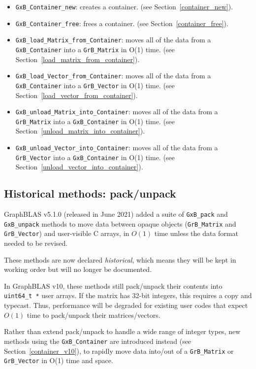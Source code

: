 \begin{itemize}
\item \verb'GxB_Container_new': creates a container.
    (see Section~\ref{container_new}).

\item \verb'GxB_Container_free': frees a container.
    (see Section~\ref{container_free}).

\item \verb'GxB_load_Matrix_from_Container': moves all of the data from a
    \verb'GxB_Container' into a \verb'GrB_Matrix' in O(1) time.
    (see Section~\ref{load_matrix_from_container}).

\item \verb'GxB_load_Vector_from_Container': moves all of the data from a
    \verb'GxB_Container' into a \verb'GrB_Vector' in O(1) time.
    (see Section~\ref{load_vector_from_container}).

\item \verb'GxB_unload_Matrix_into_Container': moves all of the data from
    a \verb'GrB_Matrix' into a \verb'GxB_Container' in O(1) time.
    (see Section~\ref{unload_matrix_into_container}).

\item \verb'GxB_unload_Vector_into_Container': moves all of the data from
    a \verb'GrB_Vector' into a \verb'GxB_Container' in O(1) time.
    (see Section~\ref{unload_vector_into_container}).

\end{itemize}

\subsection{Historical methods: pack/unpack}

GraphBLAS v5.1.0 (released in June 2021) added a suite of \verb'GxB_pack' and
\verb'GxB_unpack' methods to move data between opaque objects
(\verb'GrB_Matrix' and \verb'GrB_Vector') and user-visible C arrays, in $O(1)$
time unless the data format needed to be revised.

These methods are now declared {\em historical}, which means they will be kept
in working order but will no longer be documented.

In GraphBLAS v10, these methods still pack/unpack their contents into
\verb'uint64_t *' user arrays.  If the matrix has 32-bit integers, this
requires a copy and typecast.  Thus, performance will be degraded for existing
user codes that expect $O(1)$ time to pack/unpack their matrices/vectors.

Rather than extend pack/unpack to handle a wide range of integer types, new
methods using the \verb'GxB_Container' are introduced instead (see
Section~\ref{container_v10}), to rapidly move data into/out of a
\verb'GrB_Matrix' or \verb'GrB_Vector' in O(1) time and space.

